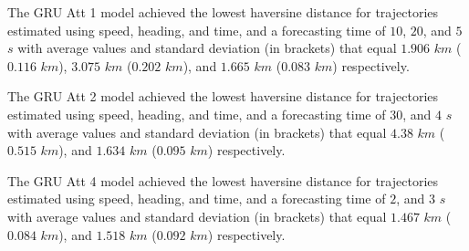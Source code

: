 The GRU Att 1 model achieved the lowest haversine distance for trajectories estimated using speed, heading, and time, and a forecasting time of $10$, $20$, and $5$ $s$ with average values and standard deviation (in brackets) that equal $1.906$ $km$ ($0.116$ $km$), $3.075$ $km$ ($0.202$ $km$), and $1.665$ $km$ ($0.083$ $km$) respectively.

The GRU Att 2 model achieved the lowest haversine distance for trajectories estimated using speed, heading, and time, and a forecasting time of $30$, and $4$ $s$ with average values and standard deviation (in brackets) that equal $4.38$ $km$ ($0.515$ $km$), and $1.634$ $km$ ($0.095$ $km$) respectively.

The GRU Att 4 model achieved the lowest haversine distance for trajectories estimated using speed, heading, and time, and a forecasting time of $2$, and $3$ $s$ with average values and standard deviation (in brackets) that equal $1.467$ $km$ ($0.084$ $km$), and $1.518$ $km$ ($0.092$ $km$) respectively.


